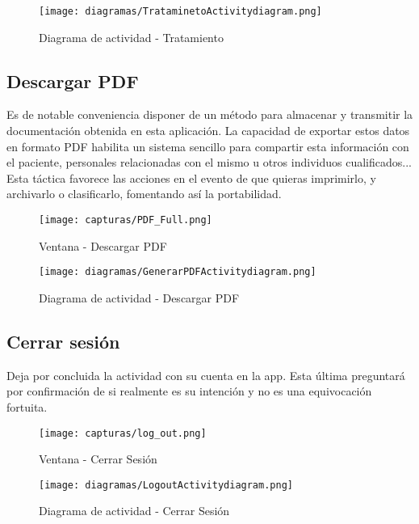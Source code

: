 \documentclass[11pt,spanish,
		listoftables,listoffigures]
		{tfgplantilla}
\begin{document}
\begin{figure}[H]
\centering
\texttt{[image: diagramas/TrataminetoActivitydiagram.png]}
\caption{Diagrama de actividad - Tratamiento}
\end{figure}

\subsection {Descargar PDF}

Es de notable conveniencia disponer de un método para almacenar y transmitir la documentación obtenida en esta aplicación. La capacidad de exportar estos datos en formato PDF habilita un sistema sencillo para compartir esta información con el paciente, personales relacionadas con el mismo u otros individuos cualificados...  Esta táctica favorece las acciones en el evento de que quieras imprimirlo, y archivarlo o clasificarlo, fomentando así la portabilidad.

\begin{figure}[H]
\centering
\texttt{[image: capturas/PDF\_Full.png]}
\caption{Ventana - Descargar PDF}
\end{figure}

\begin{figure}[H]
\centering
\texttt{[image: diagramas/GenerarPDFActivitydiagram.png]}
\caption{Diagrama de actividad - Descargar PDF}
\end{figure}

\subsection {Cerrar sesión}

Deja por concluida la actividad con su cuenta en la app. Esta última preguntará por confirmación de si realmente es su intención y no es una equivocación fortuita.

\begin{figure}[H]
\centering
\texttt{[image: capturas/log\_out.png]}
\caption{Ventana - Cerrar Sesión}
\end{figure}

\begin{figure}[H]
\centering
\texttt{[image: diagramas/LogoutActivitydiagram.png]}
\caption{Diagrama de actividad -  Cerrar Sesión}
\end{figure}

\end{document}

